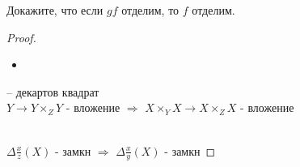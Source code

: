 \begin{prob}
Докажите, что если $g f$ отделим, то $f$ отделим.
\end{prob}
\begin{proof}
\begin{itemize}
\item[]
\end{itemize}
-- декартов квадрат\\
\vspace{0.2in}
$Y \to Y \times_Z Y$ - вложение $\Rightarrow$ $X \times_Y X \to X \times_Z X$ - вложение\\
\vspace{0.1in}
\\
$\Delta \frac{x}{z} (X)$ - замкн $\Rightarrow$ $\Delta \frac{x}{y}(X)$ - замкн
\end{proof}
\begin{comment}
\end{comment}
